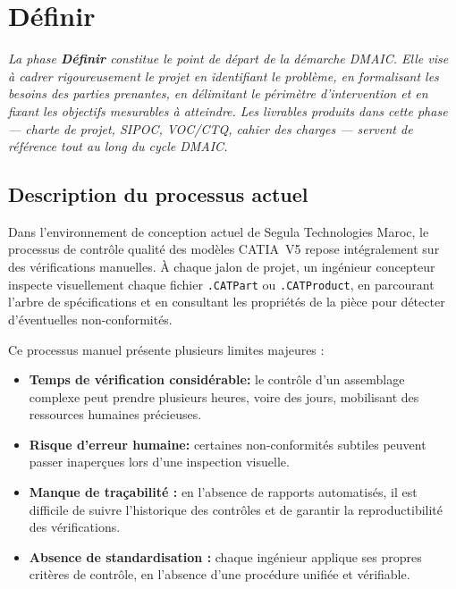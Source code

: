 \chapter{Définir}%
\label{cp:definir}

\textit{La phase \textbf{Définir} constitue le point de départ de la démarche DMAIC\@. Elle vise à cadrer rigoureusement le projet en identifiant le problème, en formalisant les besoins des parties prenantes, en délimitant le périmètre d'intervention et en fixant les objectifs mesurables à atteindre. Les livrables produits dans cette phase — charte de projet, SIPOC, VOC/CTQ, cahier des charges — servent de référence tout au long du cycle DMAIC\@.}

\section{Description du processus actuel}

Dans l'environnement de conception actuel de Segula Technologies Maroc, le processus de contrôle qualité des modèles CATIA~V5 repose intégralement sur des vérifications manuelles. À chaque jalon de projet, un ingénieur concepteur inspecte visuellement chaque fichier \texttt{.CATPart} ou \texttt{.CATProduct}, en parcourant l'arbre de spécifications et en consultant les propriétés de la pièce pour détecter d'éventuelles non-conformités.

Ce processus manuel présente plusieurs limites majeures :

\begin{itemize}
    \item[•] \textbf{Temps de vérification considérable:} le contrôle d'un assemblage complexe peut prendre plusieurs heures, voire des jours, mobilisant des ressources humaines précieuses.
    \item[•] \textbf{Risque d'erreur humaine:} certaines non-conformités subtiles peuvent passer inaperçues lors d'une inspection visuelle.
    \item[•] \textbf{Manque de traçabilité :} en l'absence de rapports automatisés, il est difficile de suivre l'historique des contrôles et de garantir la reproductibilité des vérifications.
    \item[•] \textbf{Absence de standardisation :} chaque ingénieur applique ses propres critères de contrôle, en l'absence d'une procédure unifiée et vérifiable.
\end{itemize}


